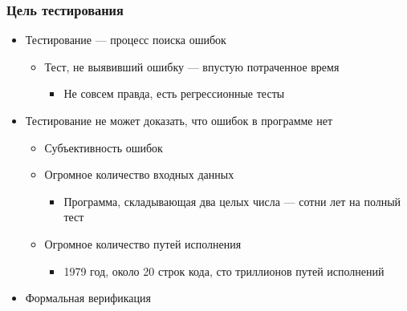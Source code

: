 \documentclass{../../slides-style}
\begin{document}
    \begin{frame}
        \frametitle{Цель тестирования}
        \begin{itemize}
            \item Тестирование --- процесс поиска ошибок
            \begin{itemize}
                \item Тест, не выявивший ошибку --- впустую потраченное время
                \begin{itemize}
                    \item Не совсем правда, есть регрессионные тесты
                \end{itemize}
            \end{itemize}
            \item Тестирование не может доказать, что ошибок в программе нет
            \begin{itemize}
                \item Субъективность ошибок
                \item Огромное количество входных данных
                \begin{itemize}
                    \item Программа, складывающая два целых числа --- сотни лет на полный тест
                \end{itemize}
                \item Огромное количество путей исполнения
                \begin{itemize}
                    \item 1979 год, около 20 строк кода, сто триллионов путей исполнений
                \end{itemize}
            \end{itemize}
            \item Формальная верификация
        \end{itemize}
    \end{frame}
\end{document}
